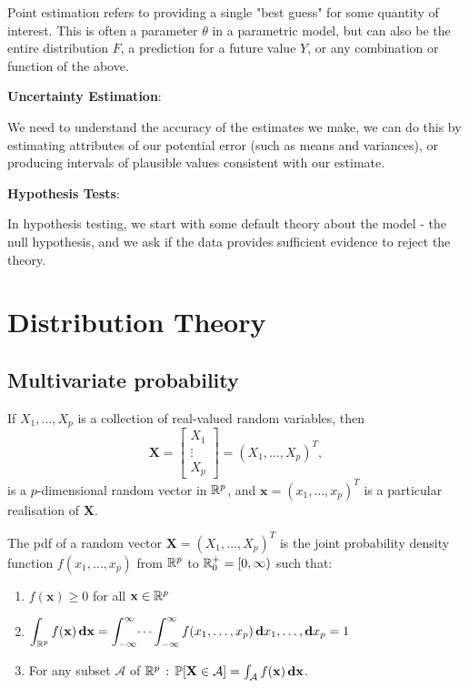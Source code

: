 \documentclass[10pt, a4paper]{article}
\begin{document}
Point estimation refers to providing a single "best guess" for some quantity of interest.
This is often a parameter $\theta$ in a parametric model,
but can also be the entire distribution $F$,
a prediction for a future value $Y$,
or any combination or function of the above.

\textbf{Uncertainty Estimation}:

We need to understand the accuracy of the estimates we make,
we can do this by estimating attributes of our potential error
(such as means and variances),
or producing intervals of plausible values consistent with our estimate.

\textbf{Hypothesis Tests}:

In hypothesis testing,
we start with some default theory about the model - the null hypothesis,
and we ask if the data provides sufficient evidence to reject the theory.

\newpage

\section{Distribution Theory}

\subsection{Multivariate probability}

\begin{definition}
    If $X_1, \dotsc, X_p$ is a collection of real-valued random variables,
    then
    \[
    \mathbf{X} = \begin{bmatrix}
        X_1 \\ \vdots \\ X_p
    \end{bmatrix} = (X_1, \dotsc, X_p) ^ T,
    \]
    is a $p$-dimensional random vector in $\mathbb{R} ^ p$,
    and $\mathbf{x} = (x_1, \dotsc, x_p) ^ T$ is a particular realisation of $\mathbf{X}$.
\end{definition}

\begin{definition}
    The pdf of a random vector $\mathbf{X} = (X_1, \dotsc, X_p) ^ T$ is the joint probability density function $f(x_1, \dotsc, x_p)$ from $\mathbb{R} ^ p$ to $\mathbb{R}_{0}^{+} = [0, \infty)$ such that:
    
    \begin{enumerate}[label = (\roman*)]
        \item $f(\mathbf{x}) \geq 0$ for all $\mathbf{x} \in \mathbb{R} ^ p$

        \item $\displaystyle\int_{\mathbb{R} ^ p}f(\mathbf{x})\,\mathbf{dx} = \int_{-\infty}^{\infty} \dotsi\int_{-\infty}^{\infty}f(x_1, \dotsc, x_p)\,\mathbf{d}x_1, \dotsc, \mathbf{d}x_p = 1$

        \item For any subset $\mathcal{A}$ of $\mathbb{R} ^ p\,:\,\mathbb{P}[\mathbf{X} \in \mathcal{A}] = \int_{\mathcal{A}}f(\mathbf{x})\,\mathbf{dx}$.
    \end{enumerate}
\end{definition}
\end{document}
